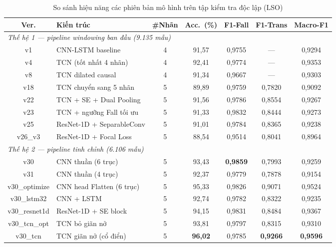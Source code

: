 \documentclass[../DoAn.tex]{subfiles}
\begin{document}
\begin{table}[H]
\centering
\caption{So sánh hiệu năng các phiên bản mô hình trên tập kiểm tra độc lập (LSO)}
\label{tab:model_comparison}
\footnotesize
\setlength{\tabcolsep}{3pt}
\begin{tabular}{|c|l|c|c|c|c|c|}
\hline
\textbf{Ver.} & \textbf{Kiến trúc} & \textbf{\#Nhãn} & \textbf{Acc.\ (\%)} & \textbf{F1-Fall} & \textbf{F1-Trans} & \textbf{Macro-F1} \\
\hline
\multicolumn{7}{|l|}{\textit{Thế hệ 1 --- pipeline windowing ban đầu (9.135 mẫu)}} \\
\hline
v1      & CNN-LSTM baseline               & 4 & 91,57 & 0,9755 & ---    & 0,9294 \\
v4      & TCN (tốt nhất 4 nhãn)           & 4 & 92,41 & 0,9774 & ---    & 0,9353 \\
v8      & TCN dilated causal              & 4 & 91,34 & 0,9667 & ---    & 0,9303 \\
v18     & TCN chuyển sang 5 nhãn          & 5 & 89,89 & 0,9759 & 0,7820 & 0,9092 \\
v22     & TCN + SE + Dual Pooling         & 5 & 91,56 & 0,9786 & 0,8554 & 0,9267 \\
v23     & TCN + ngưỡng Fall tối ưu        & 5 & 91,33 & 0,9832 & 0,8444 & 0,9273 \\
v25     & ResNet-1D + SeparableConv       & 5 & 91,01 & 0,9784 & 0,8365 & 0,9238 \\
v26\_v3 & ResNet-1D + Focal Loss          & 5 & 88,54 & 0,9514 & 0,8041 & 0,8964 \\
\hline
\multicolumn{7}{|l|}{\textit{Thế hệ 2 --- pipeline tinh chỉnh (6.106 mẫu)}} \\
\hline
v30           & CNN thuần (6 trục)        & 5 & 93,43 & \textbf{0,9859} & 0,7993 & 0,9259 \\
v31           & CNN thuần (4 trục)        & 5 & 92,37 & 0,9779 & 0,7878 & 0,9154 \\
v30\_optimize & CNN head Flatten (6 trục) & 5 & 95,33 & 0,9826 & 0,9071 & 0,9524 \\
v30\_lstm32   & CNN + LSTM                & 5 & 92,74 & 0,9782 & 0,8322 & 0,9235 \\
v30\_resnet1d & ResNet-1D + SE block      & 5 & 94,15 & 0,9831 & 0,8484 & 0,9367 \\
v30\_tcn\_opt & TCN bỏ giãn nở            & 5 & 93,81 & 0,9797 & 0,8315 & 0,9310 \\
v30\_tcn      & TCN giãn nở (cổ điển)     & 5 & \textbf{96,02} & 0,9785 & \textbf{0,9266} & \textbf{0,9596} \\
\hline
\end{tabular}
\end{table}
\end{document}
